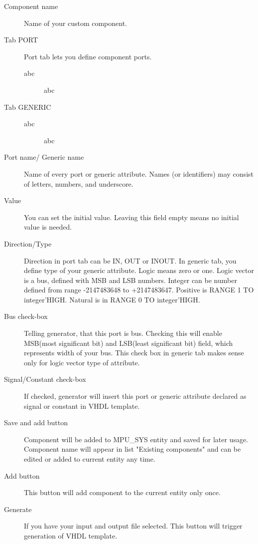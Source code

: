     \begin{description}
        \item [Component name]
            Name of your custom component.

        \item[Tab PORT]
            Port tab lets you define component ports.
            \begin{description}
                \item[abc] abc
            \end{description}

        \item[Tab GENERIC]
            \begin{description}
                \item[abc] abc
            \end{description}

        \item [Port name/ Generic name]
            Name of every port or generic attribute. Names (or identifiers) may consist of letters, numbers, and underscore.
        \item [Value]
            You can set the initial value. Leaving this field empty means no initial value is needed.
        \item [Direction/Type]
            Direction in port tab can be IN, OUT or INOUT. In generic tab, you define type of your generic attribute. Logic means zero or one. Logic vector is a bus, defined with MSB and LSB numbers.
            Integer can be number defined from range -2147483648 to +2147483647. Positive is RANGE 1 TO integer’HIGH. Natural is in RANGE 0 TO integer’HIGH.
        \item [Bus check-box]
            Telling generator, that this port is bus. Checking this will enable MSB(most significant bit) and LSB(least significant bit) field, which represents width of your bus.
            This check box in generic tab makes sense only for logic vector type of attribute.
        \item [Signal/Constant check-box]
            If checked, generator will insert this port or generic attribute declared as signal or constant in VHDL template.
        \item [Save and add button]
            Component will be added to MPU\_SYS entity and saved for later usage. Component name will appear in list "Existing components" and can be edited or added to current entity any time.
        \item [Add button]
            This button will add component to the current entity only once.
        \item [Generate]
            If you have your input and output file selected. This button will trigger generation of VHDL template.\\
    \end{description}
